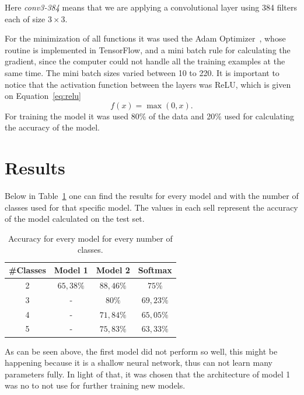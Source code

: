 \documentclass{article}
\begin{document}
  Here \textit{conv3-384} means that we are applying a convolutional
  layer using 384 filters each of size $3\times 3$.

  For the minimization of all functions it was used the Adam Optimizer~\cite{adam},
  whose routine is implemented in TensorFlow, and a mini batch rule for
  calculating the gradient, since the computer could not handle all the
  training examples at the same time. The mini batch sizes varied between
  10 to 220. It is important to notice that the activation function between
  the layers was ReLU, which is given on Equation~\eqref{eq:relu}
  \begin{equation}\label{eq:relu}
    f(x) = \max(0,x).
  \end{equation}
  For training the model it was used 80\% of the data and 20\% used for
  calculating the accuracy of the model.

\section{Results}
  Below in Table~\ref{tab:results} one can find the results for every model and
  with the number of classes used for that specific model. The values in each sell
  represent the accuracy of the model calculated on the test set.
  \begin{table}[htb]
    \centering
    \caption{Accuracy for every model for every number of classes.}
    \vskip 2mm
    \label{tab:results}
    \begin{tabular}{@{}cccc@{}}
      \toprule
      \textbf{\#Classes}        & \textbf{Model 1} & \textbf{Model 2} & \textbf{Softmax} \\
      \midrule
      2                         & $65,38\%$        & $88,46\%$        & $75\%$           \\
      3                         & -                & $80\%$           & $69,23\%$        \\
      4                         & -                & $71,84\%$        & $65,05\%$        \\
      5                         & -                & $75,83\%$        & $63,33\%$        \\
      \bottomrule
    \end{tabular}
  \end{table}

  As can be seen above, the first model did not perform so well, this might
  be happening because it is a shallow neural network, thus can not learn
  many parameters fully. In light of that, it was chosen that the
  architecture of model 1 was no to not use for further training new models.
\end{document}
